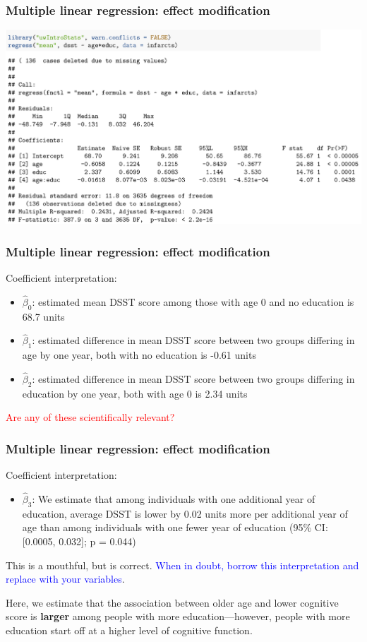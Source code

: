 \documentclass[12pt, 
hyperref={colorlinks=true, linkcolor=blue, urlcolor=cyan}]{beamer}
\begin{document}
\begin{frame}
\frametitle{Multiple linear regression: effect modification}

\vspace{-1cm}\hspace*{-0.5cm}
\includegraphics[width=1.1\textwidth]{plots/dsst_age_educ_em.png}

\end{frame}

\begin{frame}
\frametitle{Multiple linear regression: effect modification}
Coefficient interpretation:
\begin{itemize}
\item $\hat{\beta}_0$: estimated mean DSST score among those with age 0 and no education is 68.7 units
\item $\hat{\beta}_1$: estimated difference in mean DSST score between two groups differing in age by one year, both with no education is -0.61 units
\item $\hat{\beta}_2$: estimated difference in mean DSST score between two groups differing in education by one year, both with age 0 is 2.34 units
\end{itemize}

\textcolor{red}{Are any of these scientifically relevant?}
\end{frame}

\begin{frame}
\frametitle{Multiple linear regression: effect modification}
Coefficient interpretation:
\begin{itemize}
\item $\hat{\beta}_3$: We estimate that among individuals with one additional year of education, average DSST is lower by 0.02 units more per additional year of age than among individuals with one fewer year of education (95\% CI: [0.0005, 0.032]; p = 0.044)
\end{itemize}

This is a mouthful, but is correct. \textcolor{blue}{When in doubt, borrow this interpretation and replace with your variables}.

Here, we estimate that the association between older age and lower cognitive score is \textbf{larger} among people with more education---however, people with more education start off at a higher level of cognitive function. 
\end{frame}
\end{document}
